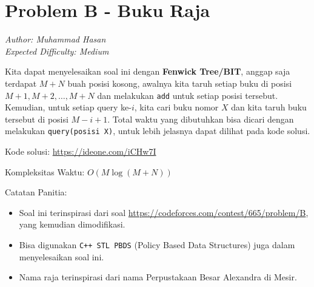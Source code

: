 \section*{Problem B - Buku Raja}
\textit{Author: Muhammad Hasan}
\\
\textit{Expected Difficulty: Medium}

Kita dapat menyelesaikan soal ini dengan \textbf{Fenwick Tree/BIT}, anggap saja terdapat $M + N$ buah posisi kosong, awalnya kita taruh setiap buku di posisi $M + 1, M + 2, \dots, M + N$ dan melakukan \lstinline|add| untuk setiap posisi tersebut. Kemudian, untuk setiap query ke-$i$, kita cari buku nomor $X$ dan kita taruh buku tersebut di posisi $M - i + 1$. Total waktu yang dibutuhkan bisa dicari dengan melakukan \lstinline|query(posisi X)|, untuk lebih jelasnya dapat dilihat pada kode solusi.

Kode solusi: \url{https://ideone.com/iCHw7I}

Kompleksitas Waktu: $O(M \log(M+N))$

Catatan Panitia:

\begin{itemize}
    \item Soal ini terinspirasi dari soal \url{https://codeforces.com/contest/665/problem/B}, yang kemudian dimodifikasi.
    \item Bisa digunakan \lstinline|C++ STL PBDS| (Policy Based Data Structures) juga dalam menyelesaikan soal ini.
    \item Nama raja terinspirasi dari nama Perpustakaan Besar Alexandra di Mesir.
\end{itemize}